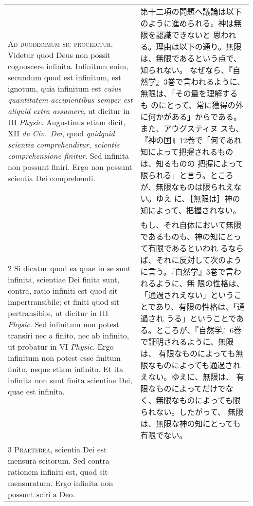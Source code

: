 \documentclass[10pt]{jsarticle} %
\begin{document}
\begin{longtable}{p{21em}p{21em}}

{\huge A}{\scshape d duodecimum sic proceditur}. Videtur quod Deus non
possit cognoscere infinita. Infinitum enim, secundum quod est infinitum,
est ignotum, quia infinitum est {\itshape cuius quantitatem
accipientibus semper est aliquid extra assumere}, ut dicitur in III
{\itshape Physic}. Augustinus etiam dicit, XII {\itshape de Civ.~Dei},
quod {\itshape quidquid scientia comprehenditur, scientis comprehensione
finitur}. Sed infinita non possunt finiri. Ergo non possunt scientia Dei
comprehendi.

&

第十二項の問題へ議論は以下のように進められる。神は無限を認識できないと
思われる。理由は以下の通り。無限は、無限であるという点で、知られない。
なぜなら、『自然学』3巻で言われるように、無限は、「その量を理解するも
のにとって、常に獲得の外に何かがある」からである。また、アウグスティヌ
スも、『神の国』12巻で「何であれ知によって把握されるものは、知るものの
把握によって限られる」と言う。ところが、無限なものは限られえない。ゆえ
に、［無限は］神の知によって、把握されない。


\\


2 Si dicatur quod ea quae in se sunt infinita, scientiae Dei finita
sunt, contra, ratio infiniti est quod sit impertransibile; et finiti
quod sit pertransibile, ut dicitur in III {\itshape Physic}. Sed
infinitum non potest transiri nec a finito, nec ab infinito, ut probatur
in VI {\itshape Physic}. Ergo infinitum non potest esse finitum finito,
neque etiam infinito. Et ita infinita non sunt finita scientiae Dei,
quae est infinita.

&

もし、それ自体において無限であるものも、神の知にとって有限であるといわれ
るならば、それに反対して次のように言う。『自然学』3巻で言われるように、無
限の性格は、「通過されえない」ということであり、有限の性格は、「通過され
うる」ということである。ところが、『自然学』6巻で証明されるように、無限は、
有限なものによっても無限なものによっても通過されえない。ゆえに、無限は、
有限なものによってだけでなく、無限なものによっても限られない。したがって、
無限は、無限な神の知にとっても有限でない。


\\


{\scshape 3 Praeterea}, scientia Dei est mensura scitorum. Sed contra
rationem infiniti est, quod sit mensuratum. Ergo infinita non possunt
sciri a Deo.



\end{longtable}
\end{document}
